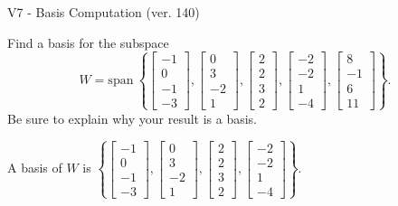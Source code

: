 \begin{exercise}
  \begin{exerciseTitle}V7 - Basis Computation (ver. 140)\end{exerciseTitle}
  \begin{exerciseStatement}
    Find a basis for the subspace 
\[W=\mathrm{span}\ \left\{\left[\begin{array}{r}
-1 \\
0 \\
-1 \\
-3
\end{array}\right] , \left[\begin{array}{r}
0 \\
3 \\
-2 \\
1
\end{array}\right] , \left[\begin{array}{r}
2 \\
2 \\
3 \\
2
\end{array}\right] , \left[\begin{array}{r}
-2 \\
-2 \\
1 \\
-4
\end{array}\right] , \left[\begin{array}{r}
8 \\
-1 \\
6 \\
11
\end{array}\right]\right\}.\]
 Be sure to explain why your result is a basis.


  \end{exerciseStatement}
  \begin{exerciseAnswer}
   A basis of \(W\) is  \(\left\{\left[\begin{array}{r}
-1 \\
0 \\
-1 \\
-3
\end{array}\right] , \left[\begin{array}{r}
0 \\
3 \\
-2 \\
1
\end{array}\right] , \left[\begin{array}{r}
2 \\
2 \\
3 \\
2
\end{array}\right] , \left[\begin{array}{r}
-2 \\
-2 \\
1 \\
-4
\end{array}\right]\right\}\).
  


  \end{exerciseAnswer}
\end{exercise}
